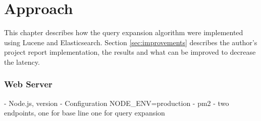 \chapter{Approach}
\label{ch:approach}
This chapter describes how the query expansion algorithm were implemented using Lucene and Elasticsearch.
Section \ref{sec:improvements} describes the author's project report \cite{project-report} implementation,
the results and what can be improved to decrease the latency.




\subsection{Web Server}
- Node.js, version
- Configuration NODE\_ENV=production
- pm2
- two endpoints, one for base line one for query expansion
